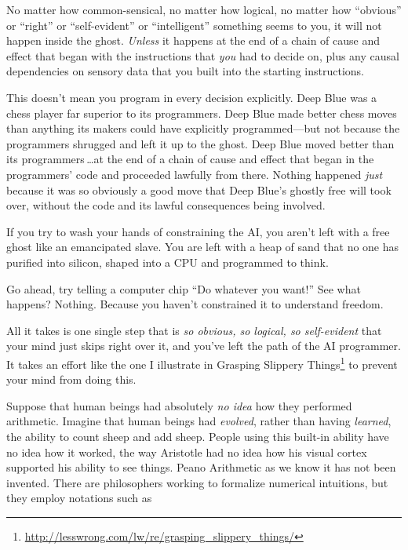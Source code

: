 {{
 No matter how common-sensical, no matter how logical, no matter
how ``obvious'' or
``right'' or
``self-evident'' or
``intelligent'' something seems to
you, it will not happen inside the ghost. \textit{Unless} it happens at
the end of a chain of cause and effect that began with the instructions
that \textit{you} had to decide on, plus any causal dependencies on
sensory data that you built into the starting instructions.}

{
 This doesn't mean you program in every decision
explicitly. Deep Blue was a chess player far superior to its
programmers. Deep Blue made better chess moves than anything its makers
could have explicitly programmed---but not because the programmers
shrugged and left it up to the ghost. Deep Blue moved better than its
programmers\,\ldots at the end of a chain of cause and effect that began
in the programmers' code and proceeded lawfully from
there. Nothing happened \textit{just} because it was so obviously a
good move that Deep Blue's ghostly free will took over,
without the code and its lawful consequences being involved.}

{
 If you try to wash your hands of constraining the AI, you
aren't left with a free ghost like an emancipated
slave. You are left with a heap of sand that no one has purified into
silicon, shaped into a CPU and programmed to think.}

{
 Go ahead, try telling a computer chip ``Do
whatever you want!'' See what happens? Nothing.
Because you haven't constrained it to understand
freedom.}

{
 All it takes is one single step that is \textit{so obvious, so
logical, so self-evident} that your mind just skips right over it, and
you've left the path of the AI programmer. It takes an
effort like the one I illustrate in Grasping Slippery Things\footnote{\url{http://lesswrong.com/lw/re/grasping_slippery_things/}} to prevent
your mind from doing this.}

\myendsectiontext


{
 Suppose that human beings had absolutely \textit{no idea} how they
performed arithmetic. Imagine that human beings had \textit{evolved},
rather than having \textit{learned}, the ability to count sheep and add
sheep. People using this built-in ability have no idea how it worked,
the way Aristotle had no idea how his visual cortex supported his
ability to see things. Peano Arithmetic as we know it has not been
invented. There are philosophers working to formalize numerical
intuitions, but they employ notations such as}

}
